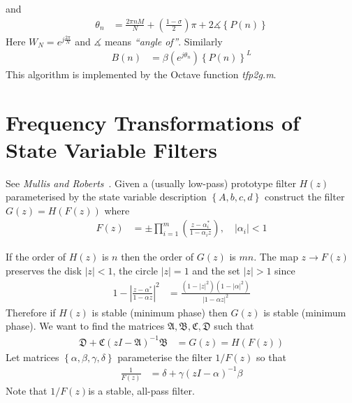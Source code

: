\documentclass[a4paper,twoside,10pt,english]{report}
\begin{document}
and
\begin{align*}
\theta_{n} &= \frac{2\pi nM}{N}+\left(\frac{1-\sigma}{2}\right)\pi+2\measuredangle\left\{ P\left(n\right)\right\} 
\end{align*}
Here $W_{N}=e^{j\frac{2\pi}{N}}$ and $\measuredangle$ means \emph{``angle of''}. 
Similarly
\begin{align*}
B\left(n\right) &= \beta\left(e^{j\theta_{n}}\right)\left\{ P\left(n\right)\right\} ^{L}
\end{align*}
This algorithm is implemented by the Octave function \emph{tfp2g.m}.
\section{\label{sec:Frequency-Transformations-of-State-Variable-Filters}Frequency Transformations of State Variable Filters}
See \emph{Mullis and Roberts}~\cite[Section 6.7]{MullisRoberts_RoundoffNoiseInDigitalFiltersFrequencyTransformations}. 
Given a (usually low-pass) prototype filter $H\left(z\right)$ parameterised
by the state variable description $\left\{ A,b,c,d\right\}$ construct the 
filter $G\left(z\right)=H\left(F\left(z\right)\right)$ where 
\begin{align*}
F\left(z\right) &= \pm\prod_{i=1}^{m}\left(\frac{z-\alpha_{i}^{*}}{1-\alpha_{i}z}\right),\quad\left|\alpha_{i}\right|<1
\end{align*}


If the order of $H\left(z\right)$ is $n$ then the order of $G\left(z\right)$
is $mn$. The map $z\rightarrow F\left(z\right)$ preserves the disk
$\left|z\right|<1$, the circle $\left|z\right|=1$ and the set $\left|z\right|>1$
since
\begin{align*}
1-\left|\frac{z-\alpha^{*}}{1-\alpha z}\right|^{2} &= \frac{\left(1-\left|z\right|^{2}\right)\left(1-\left|\alpha\right|^{2}\right)}{\left|1-\alpha z\right|^{2}}
\end{align*}
Therefore if $H\left(z\right)$ is stable (minimum phase) then $G\left(z\right)$
is stable (minimum phase). We want to find the matrices $\mathfrak{A},\mathfrak{B},\mathfrak{C},\mathfrak{D}$
such that 
\begin{align*}
\mathfrak{D}+\mathfrak{C}\left(zI-\mathfrak{A}\right)^{-1}\mathfrak{B} &= 
G\left(z\right) = H\left(F\left(z\right)\right)
\end{align*}
Let matrices $\left\{\alpha,\beta,\gamma,\delta\right\}$ parameterise the filter
$1/F\left(z\right)$ so that 
\begin{align*}
\frac{1}{F\left(z\right)} &= \delta+\gamma\left(zI-\alpha\right)^{-1}\beta
\end{align*}
Note that $1/F\left(z\right)$is a stable, all-pass filter. 
\end{document}
